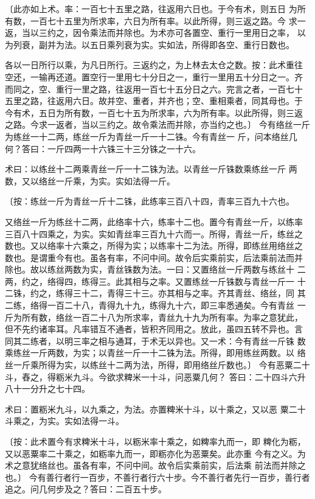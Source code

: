 \documentclass[12pt,UTF8]{ctexbook}
\begin{document}
〔此亦如上术。率：一百七十五里之路，往返用六日也。于今有术，则五日 为所有数，一百七十五里为所求率，六日为所有率。以此所得，则三返之路。今 求一返，当以三约之，因令乘法而并除也。为术亦可各置空、重行一里用日之率， 以为列衰，副并为法。以五日乘列衰为实。实如法，所得即各空、重行日数也。

各以一日所行以乘，为凡日所行。三返约之，为上林去太仓之数。按：此术重往 空还，一输再还道。置空行一里用七十分日之一，重行一里用五十分日之一。齐 而同之，空、重行一里之路，往返用一百七十五分日之六。完言之者，一百七十 五里之路，往返用六日。故并空、重者，并齐也；空、重相乘者，同其母也。于 今有术，五日为所有数，一百七十五为所求率，六为所有率。以此所得，则三返 之路。今求一返者，当以三约之。故令乘法而并除，亦当约之也。〕 今有络丝一斤为练丝一十二两，练丝一斤为青丝一斤一十二铢。今有青丝一 斤，问本络丝几何？答曰：一斤四两一十六铢三十三分铢之一十六。

术曰：以练丝十二两乘青丝一斤一十二铢为法。以青丝一斤铢数乘练丝一斤 两数，又以络丝一斤乘，为实。实如法得一斤。

〔按：练丝一斤为青丝一斤十二铢，此练率三百八十四，青率三百九十六也。

又络丝一斤为练丝十二两，此络率十六，练率十二也。置今有青丝一斤，以练率 三百八十四乘之，为实。实如青丝率三百九十六而一。所得，青丝一斤，练丝之 数也。又以络率十六乘之，所得为实；以练率十二为法。所得，即练丝用络丝之 数也。是谓重今有也。虽各有率，不问中间。故令后实乘前实，后法乘前法而并 除也。故以练丝两数为实，青丝铢数为法。一曰：又置络丝一斤两数与练丝十 二两，约之，络得四，练得三。此其相与之率。又置练丝一斤铢数与青丝一斤一 十二铢，约之，练得三十二，青得三十三。亦其相与之率。齐其青丝、络丝，同 其二练，络得一百二十八，青得九十九，练得九十六，即三率悉通矣。今有青丝 一斤为所有数，络丝一百二十八为所求率，青丝九十九为所有率。为率之意犹此， 但不先约诸率耳。凡率错互不通者，皆积齐同用之。放此，虽四五转不异也。言 同其二练者，以明三率之相与通耳，于术无以异也。又一术：今有青丝一斤铢 数乘练丝一斤两数，为实；以青丝一斤一十二铢为法。所得，即用练丝两数。以 络丝一斤乘所得为实，以练丝十二两为法，所得，即用络丝斤数也。〕 今有恶粟二十斗，舂之，得粝米九斗。今欲求粺米一十斗，问恶粟几何？ 答曰：二十四斗六升八十一分升之七十四。

术曰：置粝米九斗，以九乘之，为法。亦置粺米十斗，以十乘之，又以恶 粟二十斗乘之，为实。实如法得一斗。

〔按：此术置今有求粺米十斗，以粝米率十乘之，如粺率九而一，即 粺化为粝，又以恶粟率二十乘之，如粝率九而一，即粝亦化为恶粟矣。此亦重 今有之义。为术之意犹络丝也。虽各有率，不问中间。故令后实乘前实，后法乘 前法而并除之也。〕 今有善行者行一百步，不善行者行六十步。今不善行者先行一百步，善行者 追之。问几何步及之？答曰：二百五十步。
\end{document}
